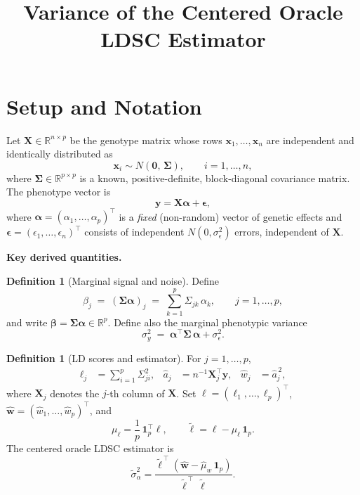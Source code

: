 \documentclass[11pt]{article}
\title{Variance of the Centered Oracle LDSC Estimator}
\author{}
\date{}
\newcommand{\X}{\mathbf{X}}
\newcommand{\y}{\mathbf{y}}
\newcommand{\bbR}{\mathbb{R}}
\newcommand{\one}{\mathbf{1}}
\newcommand{\bSig}{\boldsymbol{\Sigma}}
\newcommand{\balpha}{\boldsymbol{\alpha}}
\newcommand{\beps}{\boldsymbol{\epsilon}}
\newcommand{\bbeta}{\boldsymbol{\beta}}
\newcommand{\bx}{\mathbf{x}}
\theoremstyle{plain}
\theoremstyle{definition}
\newtheorem{definition}[theorem]{Definition}
\theoremstyle{remark}
\begin{document}
\maketitle

\section{Setup and Notation}

Let $\X\in\bbR^{n\times p}$ be the genotype matrix whose rows
$\bx_1,\dots,\bx_n$ are independent and identically distributed
as
\[
    \bx_i \sim N(\mathbf{0},\,\bSig), \qquad i=1,\dots,n,
\]
where $\bSig\in\bbR^{p\times p}$ is a known, positive-definite,
block-diagonal covariance matrix.
The phenotype vector is
\[
    \y = \X\balpha + \beps,
\]
where $\balpha=(\alpha_1,\dots,\alpha_p)^\top$ is a \emph{fixed}
(non-random) vector of genetic effects and
$\beps=(\epsilon_1,\dots,\epsilon_n)^\top$ consists of independent
$N(0,\sigma_\epsilon^2)$ errors, independent of $\X$.

\medskip
\noindent\textbf{Key derived quantities.}

\begin{definition}[Marginal signal and noise]\label{def:beta}
Define
\[
    \beta_j \;=\; (\bSig\balpha)_j \;=\; \sum_{k=1}^{p}\Sigma_{jk}\,\alpha_k,
    \qquad j=1,\dots,p,
\]
and write $\bbeta = \bSig\balpha \in \bbR^p$.
Define also the marginal phenotypic variance
\[
    \sigma_y^2 \;=\; \balpha^\top\bSig\,\balpha + \sigma_\epsilon^2.
\]
\end{definition}

\begin{definition}[LD scores and estimator]\label{def:ld}
For $j=1,\dots,p$,
\begin{align}
    \ell_j &= \sum_{i=1}^{p}\Sigma_{ji}^2, &
    \widehat{a}_j &= n^{-1}\X_j^\top\y, &
    \widehat{w}_j &= \widehat{a}_j^{\,2}, \label{eq:defs}
\end{align}
where $\X_j$ denotes the $j$-th column of $\X$.
Set $\boldsymbol{\ell}=(\ell_1,\dots,\ell_p)^\top$,
$\widehat{\mathbf{w}}=(\widehat{w}_1,\dots,\widehat{w}_p)^\top$,
and
\[
    \mu_\ell = \frac{1}{p}\,\one_p^\top\boldsymbol{\ell},
    \qquad
    \widetilde{\boldsymbol{\ell}} = \boldsymbol{\ell} - \mu_\ell\,\one_p .
\]
The centered oracle LDSC estimator is
\begin{equation}\label{eq:tildesig}
    \widetilde\sigma_\alpha^2
    = \frac{\widetilde{\boldsymbol{\ell}}^{\,\top}
            (\widehat{\mathbf{w}} - \widehat\mu_w\,\one_p)}
           {\widetilde{\boldsymbol{\ell}}^{\,\top}\,
            \widetilde{\boldsymbol{\ell}}} .
\end{equation}
\end{definition}
\end{document}
